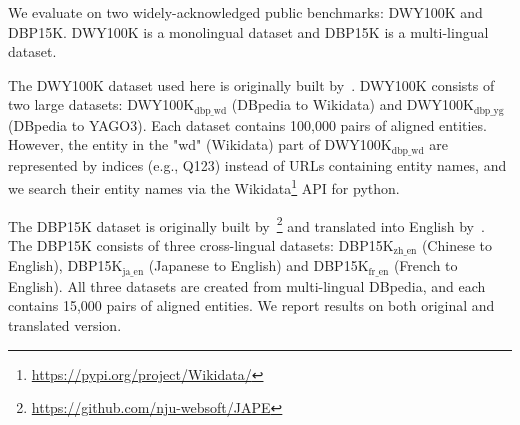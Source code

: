 We evaluate \solution on two widely-acknowledged public benchmarks: DWY100K and DBP15K. DWY100K is a monolingual dataset and DBP15K is a multi-lingual dataset.   


 The DWY100K dataset used here is originally built by~\cite{sun2018bootstrapping}. DWY100K consists of two large datasets: DWY100K$_{\text{dbp\_wd}}$ (DBpedia to Wikidata) and DWY100K$_{\text{dbp\_yg}}$ (DBpedia to YAGO3). Each dataset contains 100,000 pairs of aligned entities. However, the entity in the "wd" (Wikidata) part of DWY100K$_{\text{dbp\_wd}}$ are represented by indices (e.g., Q123) instead of URLs containing entity names, and we search their entity names via the Wikidata\footnote{\url{https://pypi.org/project/Wikidata/}} API for python.



 The DBP15K dataset is originally built by~\cite{JAPE}\footnote{\url{https://github.com/nju-websoft/JAPE}} and translated into English by~\cite{xu2019cross-lingual}. The DBP15K consists of three cross-lingual datasets: DBP15K$_{\text{zh\_en}}$ (Chinese to English), DBP15K$_{\text{ja\_en}}$ (Japanese to English) and DBP15K$_{\text{fr\_en}}$ (French to English). All three datasets are created from multi-lingual DBpedia, and each contains 15,000 pairs of aligned entities. 
We report results on both original and translated version.


